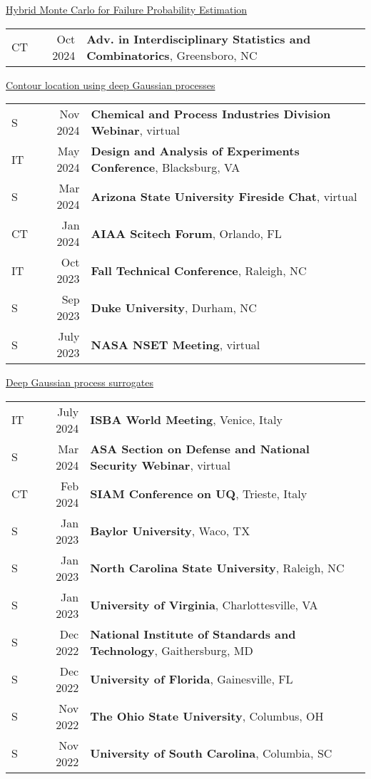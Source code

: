 \documentclass[margin,line,11pt]{res}
\begin{document}
\begin{resume}
\underline{Hybrid Monte Carlo for Failure Probability Estimation}\\
\begin{tabular}{lrl}
CT\quad\quad & Oct 2024 & {\bf Adv. in Interdisciplinary Statistics and Combinatorics}, Greensboro, NC \\
\end{tabular}

\underline{Contour location using deep Gaussian processes}\\
\begin{tabular}{lrl}
S\quad\quad & Nov 2024 & {\bf Chemical and Process Industries Division Webinar}, virtual \\
IT\quad\quad & May 2024 & {\bf Design and Analysis of Experiments Conference}, Blacksburg, VA \\
S\quad\quad & Mar 2024 & {\bf Arizona State University Fireside Chat}, virtual \\
CT\quad\quad & Jan 2024 & {\bf AIAA Scitech Forum}, Orlando, FL \\
IT\quad\quad & Oct 2023 & {\bf Fall Technical Conference}, Raleigh, NC \\
S\quad\quad & Sep 2023 & {\bf Duke University}, Durham, NC \\ 
S\quad\quad & July 2023 & {\bf NASA NSET Meeting}, virtual \\
\end{tabular}

\underline{Deep Gaussian process surrogates}\\
\begin{tabular}{lrl}
IT\quad\quad & July 2024 & {\bf ISBA World Meeting}, Venice, Italy \\
S\quad\quad & Mar 2024 & {\bf ASA Section on Defense and National Security Webinar}, virtual \\
CT\quad\quad & Feb 2024 & {\bf SIAM Conference on UQ}, Trieste, Italy \\
S\quad\quad & Jan 2023 & {\bf Baylor University}, Waco, TX \\
S\quad\quad & Jan 2023 & {\bf North Carolina State University}, Raleigh, NC \\
S\quad\quad & Jan 2023 & {\bf University of Virginia}, Charlottesville, VA \\
S\quad\quad & Dec 2022 & {\bf National Institute of Standards and Technology}, Gaithersburg, MD \\
S\quad\quad & Dec 2022 & {\bf University of Florida}, Gainesville, FL \\
S\quad\quad & Nov 2022 & {\bf The Ohio State University}, Columbus, OH \\
S\quad\quad & Nov 2022 & {\bf University of South Carolina}, Columbia, SC \\
\end{tabular}


\end{resume}
\end{document}
